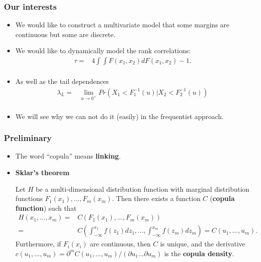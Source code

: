 \documentclass{beamer}
\begin{document}
\begin{frame}
  \frametitle{Our interests}
  \begin{itemize}

  \item We would like to construct a multivariate model that some margins are
    continuous but some are discrete.


  \item We would like to dynamically model the rank correlations:
    \begin{equation*}
      \begin{split}
        \tau = & 4 \int \int F(x_1, x_2)dF(x_1,x_2)-1. \\
      \end{split}
    \end{equation*}

  \item As well as the tail dependences
    \begin{equation*}
      \begin{split}
        \lambda_L = & \lim \limits_{u \to 0^{+}} Pr(X_1< F_1^{-1}(u)| X_2<F_2^{-1}(u))\\
      \end{split}
    \end{equation*}


\item We will see why  we can not do it (easily) in the frequentist approach.

  \end{itemize}


\end{frame}


\begin{frame}
  \frametitle{Preliminary}
  \begin{itemize}
  \item The word ``copula'' means \textbf{linking}.
  \item \textbf{Sklar's theorem}

    Let $H$ be a multi-dimensional distribution function with marginal
    distribution functions $F_1(x_1),...,F_m(x_m)$. Then there exists a
    function $C$ (\textbf{copula function}) such that
    \begin{equation*}
      \begin{split}
        H(x_1,...,x_m)= & C(F_1(x_1),...,F_m(x_m))\\
        =&C\left(\int_{-\infty}^{x_1}f(z_1)dz_1,...,\int_{-\infty}^{x_m}f(z_m)dz_m\right)=C(u_1,...,u_m).
      \end{split}
    \end{equation*}
    Furthermore, if $F_i(x_i)$ are continuous, then $C$ is unique, and the derivative $c(u_1,...,u_m)= \partial^m C(u_1,...,u_m)/(\partial u_1...
    \partial u_m)$ is the \textbf{copula density}.

  \end{itemize}
\end{frame}
\end{document}
